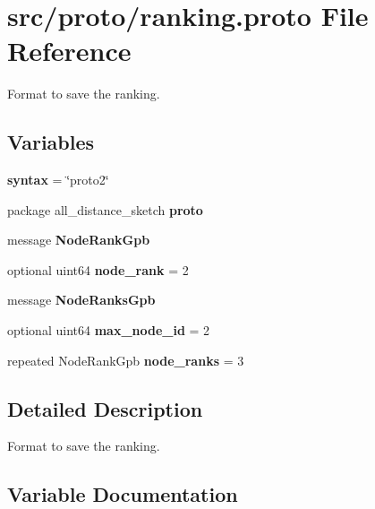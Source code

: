 \hypertarget{ranking_8proto}{}\section{src/proto/ranking.proto File Reference}
\label{ranking_8proto}


Format to save the ranking.  


\subsection*{Variables}
\begin{DoxyCompactItemize}
\item 
\hypertarget{ranking_8proto_adbedb258e13546cc707a6ebb073a3d8a}{}{\bfseries syntax} = \char`\"{}proto2\char`\"{}\label{ranking_8proto_adbedb258e13546cc707a6ebb073a3d8a}

\item 
\hypertarget{ranking_8proto_a0c41dcc24abdb230ee669507323945ae}{}package all\+\_\+distance\+\_\+sketch {\bfseries proto}\label{ranking_8proto_a0c41dcc24abdb230ee669507323945ae}

\item 
message {\bfseries Node\+Rank\+Gpb}
\item 
\hypertarget{ranking_8proto_ac9f2ee4d0b287dcc70f6d199e37d5c52}{}optional uint64 {\bfseries node\+\_\+rank} = 2\label{ranking_8proto_ac9f2ee4d0b287dcc70f6d199e37d5c52}

\item 
message {\bfseries Node\+Ranks\+Gpb}
\item 
\hypertarget{ranking_8proto_ac3aeef3c04f1e94269646b50a81aa9f1}{}optional uint64 {\bfseries max\+\_\+node\+\_\+id} = 2\label{ranking_8proto_ac3aeef3c04f1e94269646b50a81aa9f1}

\item 
\hypertarget{ranking_8proto_a45eecc3f83c30649c709bd7e7b537e20}{}repeated Node\+Rank\+Gpb {\bfseries node\+\_\+ranks} = 3\label{ranking_8proto_a45eecc3f83c30649c709bd7e7b537e20}

\end{DoxyCompactItemize}


\subsection{Detailed Description}
Format to save the ranking. 



\subsection{Variable Documentation}
\hypertarget{ranking_8proto_ab1af16dd5bbf86f7aebf63324b196f08}{}
